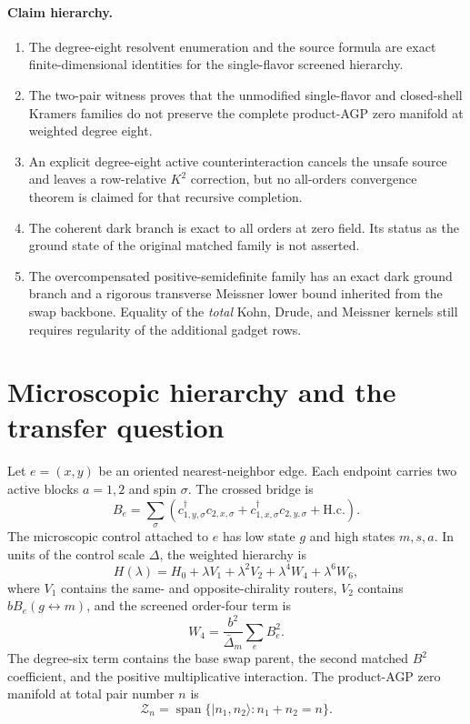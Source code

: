\documentclass[11pt]{article}
\theoremstyle{definition}
\theoremstyle{remark}
\newcommand{\cZ}{\mathcal Z}
\newcommand{\Span}{\operatorname{span}}
\newcommand{\ket}[1]{\lvert #1\rangle}
\begin{document}
\paragraph{Claim hierarchy.}
\begin{enumerate}
\item The degree-eight resolvent enumeration and the source formula are exact finite-dimensional identities for the single-flavor screened hierarchy.
\item The two-pair witness proves that the unmodified single-flavor and closed-shell Kramers families do not preserve the complete product-AGP zero manifold at weighted degree eight.
\item An explicit degree-eight active counterinteraction cancels the unsafe source and leaves a row-relative $K^2$ correction, but no all-orders convergence theorem is claimed for that recursive completion.
\item The coherent dark branch is exact to all orders at zero field.  Its status as the ground state of the original matched family is not asserted.
\item The overcompensated positive-semidefinite family has an exact dark ground branch and a rigorous transverse Meissner lower bound inherited from the swap backbone.  Equality of the \emph{total} Kohn, Drude, and Meissner kernels still requires regularity of the additional gadget rows.
\end{enumerate}

\section{Microscopic hierarchy and the transfer question}

Let $e=(x,y)$ be an oriented nearest-neighbor edge.  Each endpoint carries two active blocks $a=1,2$ and spin $\sigma$.  The crossed bridge is
\begin{equation}
 B_e=\sum_\sigma\left(
 c_{1,y,\sigma}^\dagger c_{2,x,\sigma}
 +c_{1,x,\sigma}^\dagger c_{2,y,\sigma}+\mathrm{H.c.}\right).
 \label{eq:bridge}
\end{equation}
The microscopic control attached to $e$ has low state $g$ and high states $m,s,a$.  In units of the control scale $\Delta$, the weighted hierarchy is
\begin{equation}
 H(\lambda)=H_0+\lambda V_1+\lambda^2V_2
 +\lambda^4W_4+\lambda^6W_6,
 \label{eq:hierarchy}
\end{equation}
where $V_1$ contains the same- and opposite-chirality routers, $V_2$ contains $bB_e(g\leftrightarrow m)$, and the screened order-four term is
\begin{equation}
 W_4=\frac{b^2}{\bar\Delta_m}\sum_eB_e^2.
 \label{eq:W4}
\end{equation}
The degree-six term contains the base swap parent, the second matched $B^2$ coefficient, and the positive multiplicative interaction.  The product-AGP zero manifold at total pair number $n$ is
\begin{equation}
 \cZ_n=\Span\{\ket{n_1,n_2}:n_1+n_2=n\}.
 \label{eq:Z}
\end{equation}
\end{document}
